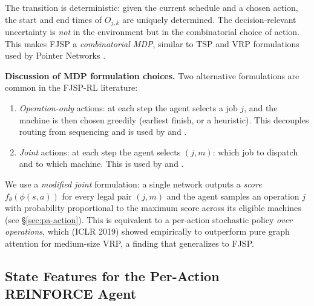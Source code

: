 \documentclass[10pt]{article}
\theoremstyle{definition}
\begin{document}
The transition is deterministic: given the current schedule
and a chosen action, the start and end times of $O_{j,k}$ are
uniquely determined. The decision-relevant uncertainty is
\emph{not} in the environment but in the combinatorial choice
of action. This makes FJSP a \emph{combinatorial MDP}, similar
to TSP and VRP formulations used by Pointer Networks
\citep{Vinyals2015}.

\textbf{Discussion of MDP formulation choices.}
Two alternative formulations are common in the FJSP-RL
literature:
\begin{enumerate}
  \item \emph{Operation-only} actions: at each step the
        agent selects a job $j$, and the machine is then
        chosen greedily (earliest finish, or a
        heuristic). This decouples routing from
        sequencing and is used by \citet{Zhang2020L2D}
        and \citet{Song2022TII}.
  \item \emph{Joint} actions: at each step the agent
        selects $(j, m)$: which job to dispatch and to
        which machine. This is used by
        \citet{Lei2022} and \citet{Yang2024}.
\end{enumerate}
We use a \emph{modified joint} formulation: a single
network outputs a \emph{score} $f_\theta(\phi(s, a))$
for every legal pair $(j, m)$ and the agent samples an
operation $j$ with probability proportional to the
maximum score across its eligible machines (see
\S\ref{sec:pa-action}). This is equivalent to a
per-action stochastic policy \emph{over operations},
which \citet{Kool2019} (ICLR 2019) showed empirically to
outperform pure graph attention for medium-size VRP, a
finding that generalizes to FJSP.

\subsection{State Features for the Per-Action REINFORCE Agent}
\end{document}
